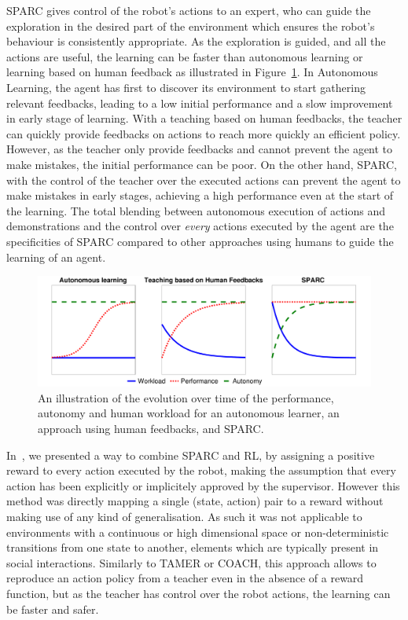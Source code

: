 \documentclass[letterpaper]{article} %
\begin{document}
SPARC gives control of the robot's actions to an expert, who can guide the
exploration in the desired part of the environment which ensures the robot's
behaviour is consistently appropriate. As the exploration is guided, and all the
actions are useful, the learning can be faster than autonomous learning or
learning based on human feedback as illustrated in Figure~\ref{fig:comparison}.
In Autonomous Learning, the agent has first to discover its environment to start
gathering relevant feedbacks, leading to a low initial performance and a slow
improvement in early stage of learning. With a teaching based on human
feedbacks, the teacher can quickly provide feedbacks on actions to reach more
quickly an efficient policy. However, as the teacher only provide feedbacks and
cannot prevent the agent to make mistakes, the initial performance can be poor.
On the other hand, SPARC, with the control of the teacher over the executed
actions can prevent the agent to make mistakes in early stages, achieving a high
performance even at the start of the learning. The total blending between
autonomous execution of actions and demonstrations and the control over
\emph{every} actions executed by the agent are the specificities of SPARC
compared to other approaches using humans to guide the learning of an agent.

\begin{figure}
    \centering
    \includegraphics[width=0.9\linewidth]{./figs/motivation.pdf}
    \caption{An illustration of the evolution over time of the performance,
    autonomy and human workload for an autonomous learner, an approach using
    human feedbacks, and SPARC.}
    \label{fig:comparison}
\end{figure}

In~\cite{senft2017supervised}, we presented a way to combine SPARC and RL, by
assigning a positive reward to every action executed by the robot, making the
assumption that every action has been explicitly or implicitely approved by the
supervisor. However this method was directly mapping a single (state, action)
pair to a reward without making use of any kind of generalisation. As such it
was not applicable to environments with a continuous or high dimensional space
or non-deterministic transitions from one state to another, elements which are
typically present in social interactions. Similarly to TAMER or COACH, this
approach allows to reproduce an action policy from a teacher even in the absence
of a reward function, but as the teacher has control over the robot actions, the
learning can be faster and safer.
\end{document}

